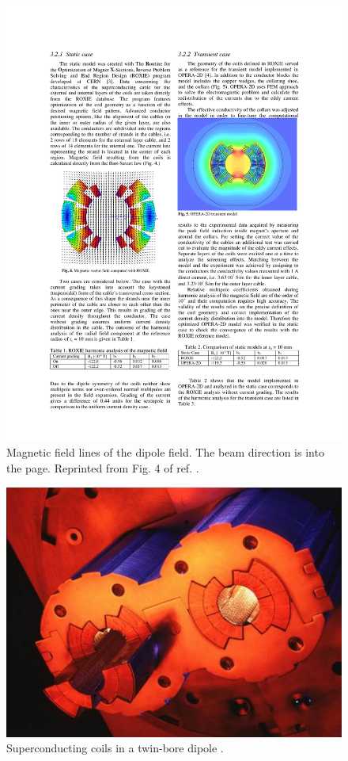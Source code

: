 \documentclass[dissertation.tex]{subfiles}
\begin{document}
\begin{figure}
	\centering
	\includegraphics[scale=1.0]{dipole_field}
	\caption{Magnetic field lines of the dipole field.  The beam direction is into the page.  Reprinted from Fig. 4 of ref. \cite{Komorowski}.}
	\label{fig:dipole_field}
\end{figure}

\begin{figure}
	\centering
	\includegraphics[scale=1.0]{coil_windings}
	\caption{Superconducting coils in a twin-bore dipole \cite{LHC_outreach_magnets}.}
	\label{fig:coil_windings}
\end{figure}
\end{document}
